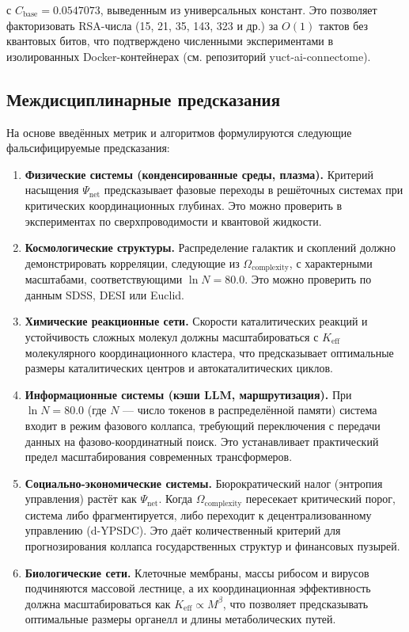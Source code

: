 \documentclass[12pt,a4paper]{article}
\theoremstyle{remark}
\newcommand{\Keff}{K_{\mathrm{eff}}}
\begin{document}
	с \(C_{\text{base}} = 0.0547073\), выведенным из универсальных констант. Это позволяет факторизовать RSA-числа (15, 21, 35, 143, 323 и др.) за \(O(1)\) тактов без квантовых битов, что подтверждено численными экспериментами в изолированных Docker-контейнерах (см. репозиторий yuct-ai-connectome).
	
	\subsection{Междисциплинарные предсказания}
	\label{subsec:predictions-complexity}
	
	На основе введённых метрик и алгоритмов формулируются следующие фальсифицируемые предсказания:
	
	\begin{enumerate}[label=(\arabic*)]
		\item \textbf{Физические системы (конденсированные среды, плазма).} Критерий насыщения \(\Psi_{\mathrm{net}}\) предсказывает фазовые переходы в решёточных системах при критических координационных глубинах. Это можно проверить в экспериментах по сверхпроводимости и квантовой жидкости.
		\item \textbf{Космологические структуры.} Распределение галактик и скоплений должно демонстрировать корреляции, следующие из \(\Omega_{\mathrm{complexity}}\), с характерными масштабами, соответствующими \(\ln N = 80.0\). Это можно проверить по данным SDSS, DESI или Euclid.
		\item \textbf{Химические реакционные сети.} Скорости каталитических реакций и устойчивость сложных молекул должны масштабироваться с \(\Keff\) молекулярного координационного кластера, что предсказывает оптимальные размеры каталитических центров и автокаталитических циклов.
		\item \textbf{Информационные системы (кэши LLM, маршрутизация).} При \(\ln N = 80.0\) (где \(N\) --- число токенов в распределённой памяти) система входит в режим фазового коллапса, требующий переключения с передачи данных на фазово-координатный поиск. Это устанавливает практический предел масштабирования современных трансформеров.
		\item \textbf{Социально-экономические системы.} Бюрократический налог (энтропия управления) растёт как \(\Psi_{\mathrm{net}}\). Когда \(\Omega_{\mathrm{complexity}}\) пересекает критический порог, система либо фрагментируется, либо переходит к децентрализованному управлению (d-YPSDC). Это даёт количественный критерий для прогнозирования коллапса государственных структур и финансовых пузырей.
		\item \textbf{Биологические сети.} Клеточные мембраны, массы рибосом и вирусов подчиняются массовой лестнице, а их координационная эффективность должна масштабироваться как \(\Keff \propto M^{\beta}\), что позволяет предсказывать оптимальные размеры органелл и длины метаболических путей.
	\end{enumerate}
	
\end{document}
